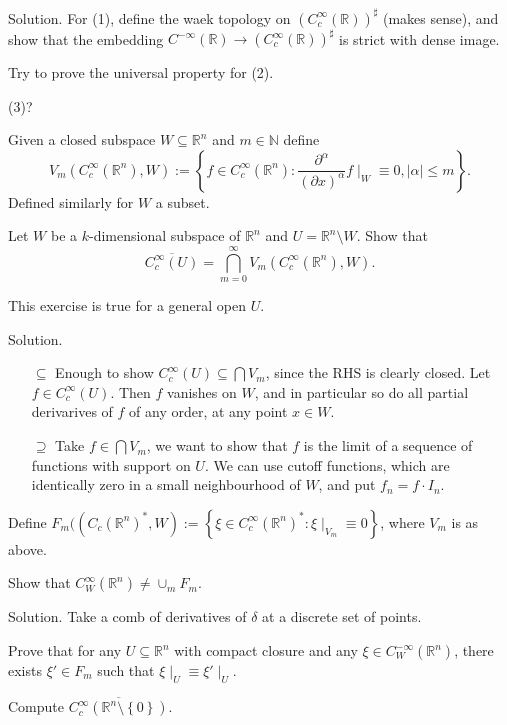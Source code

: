 \documentclass[12pt, reqno,a4paper, twoside]{amsproc}
\newcommand{\dbN}{\mathbb N}
\newcommand{\dbR}{\mathbb R}
\newcommand{\set}[1]{\left\{{#1}\right\}}
\newcommand{\abs}[1]{\left|#1\right|}
\newcommand{\widebar}{\overline}
\newenvironment{sol}{\sc Solution. \rm}{\hfill \qedsymbol\bigskip}
\begin{document}
\begin{sol}
	For (1), define the waek topology on $(C_c^\infty(\dbR))^\sharp$ (makes sense), and show that the embedding $C^{-\infty}(\dbR)\to(C_c^\infty(\dbR))^\sharp$ is strict with dense image.
	
	Try to prove the universal property for (2). 
	
	(3)?
\end{sol}
\begin{defi}
	Given a closed subspace $W\subseteq \dbR^n$  and $m\in\dbN$ define
	\[V_m(C_c^\infty(\dbR^n),W):=\set{f\in C_c^\infty(\dbR^n):\frac{\partial^\alpha}{(\partial x)^\alpha}f\mid_W\equiv0,\abs{\alpha}\le m}.\]
	Defined similarly for $W$ a subset.
\end{defi}
\begin{exer}
	Let $W$ be a $k$-dimensional subspace of $\dbR^n$ and $U=\dbR^n\setminus W$. Show that 
	\[\widebar{C_c^\infty(U)}=\bigcap_{m=0}^\infty V_m(C_c^\infty(\dbR^n),W).\]
\end{exer}
\begin{rem}This exercise is true for a general open $U$.
\end{rem}
\begin{sol}
	\begin{itemize}
		\item[$\subseteq$] Enough to show $C_c^\infty(U)\subseteq \bigcap V_m$, since the RHS is clearly closed. Let $f\in C_c^\infty(U)$. Then $f$ vanishes on $W$, and in particular so do all partial derivarives of $f$ of any order, at any point $x\in W$. 
		\item[$\supseteq$] Take $f\in \bigcap V_m$, we want to show that $f$ is the limit of a sequence of functions with support on $U$. We can use cutoff functions, which are identically zero in a small neighbourhood of $W$, and put $f_n=f\cdot I_n$. 
	\end{itemize}
\end{sol}

\begin{defi}
	Define $F_m((C_c(\dbR^n)^*,W):=\set{\xi\in C_c^\infty(\dbR^n)^*:\xi\mid_{V_m}\equiv 0}$, where $V_m$ is as above.
\end{defi}
\begin{exer}
	Show that $C_W^{\infty}(\dbR^n)\ne \cup_m F_m$. 
\end{exer}
\begin{sol}Take a comb of derivatives of $\delta$ at a discrete set of points. 
\end{sol}

\begin{exer}
	Prove that for any $U\subseteq\dbR^n$ with compact closure and any $\xi\in C^{-\infty}_W(\dbR^n)$, there exists $\xi'\in F_m$ such that $\xi\mid_U\equiv\xi'\mid_U$. 
\end{exer}

\begin{exer}
	Compute $\widebar{C_c^\infty(\dbR^n\setminus\set{0})}$.
\end{exer}
\end{document}
